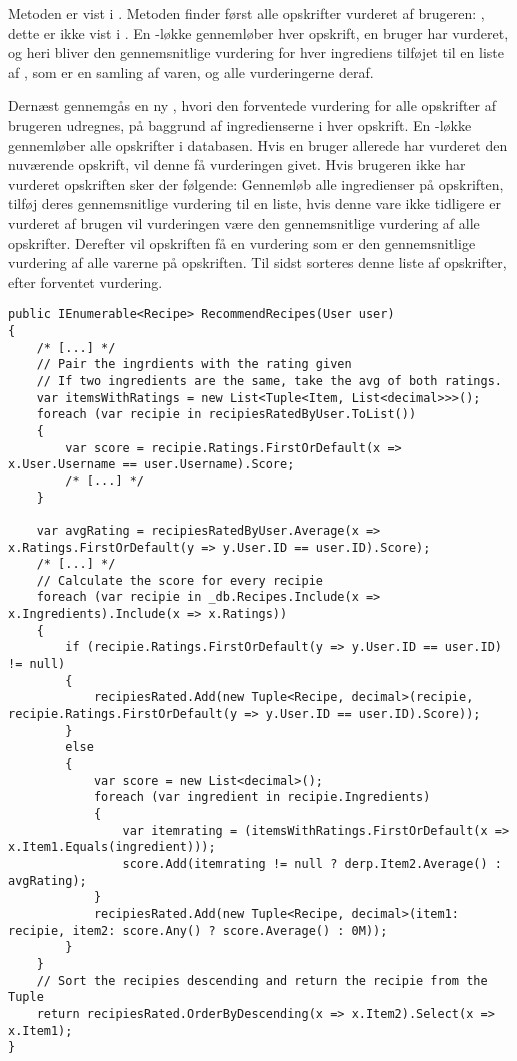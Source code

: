 Metoden  er vist i .
Metoden finder først alle opskrifter vurderet af brugeren: , dette er ikke vist i .
En -løkke gennemløber hver opskrift, en bruger har vurderet, og heri bliver den gennemsnitlige vurdering for hver ingrediens tilføjet til en liste af , som er en samling af varen, og alle vurderingerne deraf. 

Dernæst gennemgås en ny , hvori den forventede vurdering for alle opskrifter af brugeren udregnes, på baggrund af ingredienserne i hver opskrift.
En -løkke gennemløber alle opskrifter i databasen. 
Hvis en bruger allerede har vurderet den nuværende opskrift, vil denne få vurderingen givet.
Hvis brugeren ikke har vurderet opskriften sker der følgende: Gennemløb alle ingredienser på opskriften, tilføj deres gennemsnitlige vurdering til en liste, hvis denne vare ikke tidligere er vurderet af brugen vil vurderingen være den gennemsnitlige vurdering af alle opskrifter. 
Derefter vil opskriften få en vurdering som er den gennemsnitlige vurdering af alle varerne på opskriften.
Til sidst sorteres denne liste af opskrifter, efter forventet vurdering.

\begin{lstlisting}[caption=Metoden \class{RecommendRecipes}. Sorterer opskrifter efter forventede vurdering for en given bruger., label=recommendrecipes]
public IEnumerable<Recipe> RecommendRecipes(User user)
{
    /* [...] */
    // Pair the ingrdients with the rating given
    // If two ingredients are the same, take the avg of both ratings.
    var itemsWithRatings = new List<Tuple<Item, List<decimal>>>();
    foreach (var recipie in recipiesRatedByUser.ToList())
    {
        var score = recipie.Ratings.FirstOrDefault(x => x.User.Username == user.Username).Score;
        /* [...] */
    }

    var avgRating = recipiesRatedByUser.Average(x => x.Ratings.FirstOrDefault(y => y.User.ID == user.ID).Score);
    /* [...] */
    // Calculate the score for every recipie
    foreach (var recipie in _db.Recipes.Include(x => x.Ingredients).Include(x => x.Ratings))
    {
        if (recipie.Ratings.FirstOrDefault(y => y.User.ID == user.ID) != null)
        {
            recipiesRated.Add(new Tuple<Recipe, decimal>(recipie, recipie.Ratings.FirstOrDefault(y => y.User.ID == user.ID).Score));
        }
        else
        {
            var score = new List<decimal>();
            foreach (var ingredient in recipie.Ingredients)
            {
                var itemrating = (itemsWithRatings.FirstOrDefault(x => x.Item1.Equals(ingredient)));
                score.Add(itemrating != null ? derp.Item2.Average() : avgRating);
            }
            recipiesRated.Add(new Tuple<Recipe, decimal>(item1: recipie, item2: score.Any() ? score.Average() : 0M));
        }
    }
    // Sort the recipies descending and return the recipie from the Tuple
    return recipiesRated.OrderByDescending(x => x.Item2).Select(x => x.Item1);
}
\end{lstlisting}

